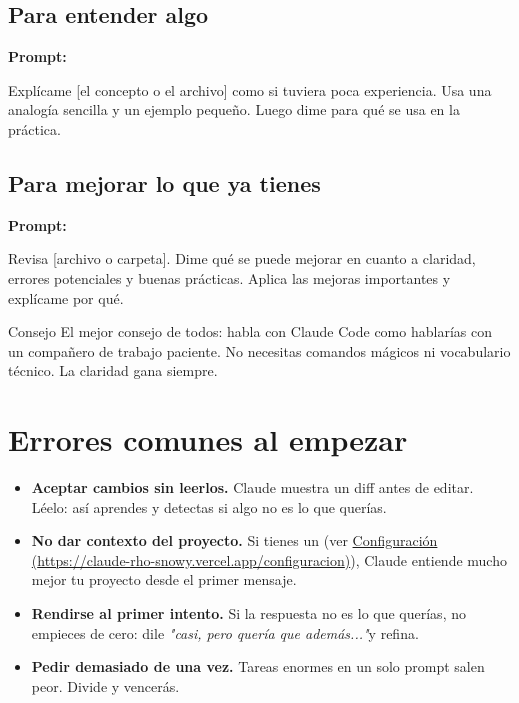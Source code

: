\documentclass[11pt,a4paper]{report}
\DeclareRobustCommand{\texttt}[1]{{\ttfamily\seqsplit{#1}}}
\begin{document}
\subsection{ Para entender algo}

\noindent\textbf{Prompt: }
\begin{codebox}
Explícame [el concepto o el archivo] como si tuviera poca experiencia. Usa una analogía sencilla y un ejemplo pequeño. Luego dime para qué se usa en la práctica.
\end{codebox}

\subsection{ Para mejorar lo que ya tienes}

\noindent\textbf{Prompt: }
\begin{codebox}
Revisa [archivo o carpeta]. Dime qué se puede mejorar en cuanto a claridad, errores potenciales y buenas prácticas. Aplica las mejoras importantes y explícame por qué.
\end{codebox}

\begin{calloutbox}{Consejo}
El mejor consejo de todos: habla con Claude Code como hablarías con un compañero de trabajo paciente. No necesitas comandos mágicos ni vocabulario técnico. La claridad gana siempre.\end{calloutbox}

\section{Errores comunes al empezar}

\begin{itemize}
\item \textbf{Aceptar cambios sin leerlos.} Claude muestra un diff antes de editar. Léelo: así aprendes y detectas si algo no es lo que querías.
\item \textbf{No dar contexto del proyecto.} Si tienes un \texttt{CLAUDE.md} (ver \href{https://claude-rho-snowy.vercel.app/configuracion}{Configuración (\url{https://claude-rho-snowy.vercel.app/configuracion})}), Claude entiende mucho mejor tu proyecto desde el primer mensaje.
\item \textbf{Rendirse al primer intento.} Si la respuesta no es lo que querías, no empieces de cero: dile \emph{"casi, pero quería que además..."}y refina.
\item \textbf{Pedir demasiado de una vez.} Tareas enormes en un solo prompt salen peor. Divide y vencerás.
\end{itemize}
\end{document}
